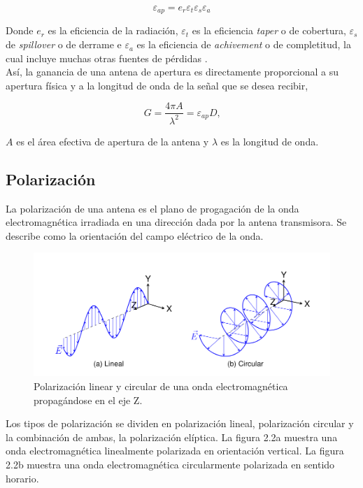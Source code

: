 \begin{equation}
    \varepsilon_{ap} = e_{r} \varepsilon_{t} \varepsilon_{s} \varepsilon_{a}
\end{equation}

Donde $e_{r}$ es la eficiencia de la radiación, $\varepsilon_{t}$ es la eficiencia \textit{taper} o de cobertura, $\varepsilon_{s}$ de \textit{spillover} o de derrame e $\varepsilon_{a}$ es la eficiencia de \textit{achivement} o de completitud, la cual incluye muchas otras fuentes de pérdidas \cite{stutzman2012antenna}.\\

Así, la ganancia de una antena de apertura es directamente proporcional a su apertura física y a la longitud de onda de la señal que se desea recibir,

\begin{equation}
    G = \frac{4\pi A}{\lambda^{2}} = \varepsilon_{ap} D \text{,}
\end{equation}

$A$ es el área efectiva de apertura de la antena y $\lambda$ es la longitud de onda.\\

\subsection{Polarización}

La polarización de una antena es el plano de progagación de la onda electromagnética irradiada en una dirección dada por la antena transmisora. Se describe como la orientación del campo eléctrico de la onda.\\

\begin{figure}
    \centering
    \includegraphics[width = 0.8\linewidth]{img/pol}
    \caption{Polarización linear y circular de una onda electromagnética propagándose en el eje Z.}
    \label{fig:polarizacion2}
\end{figure}

Los tipos de polarización se dividen en polarización lineal, polarización circular y la combinación de ambas, la polarización elíptica. La figura 2.2a muestra una onda electromagnética linealmente polarizada en orientación vertical. La figura 2.2b muestra una onda electromagnética circularmente polarizada en sentido horario.\\



